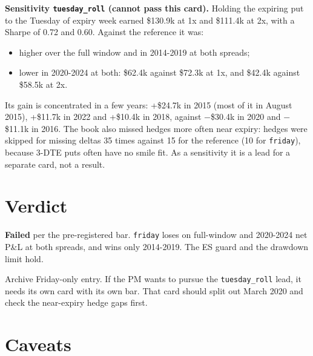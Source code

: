 \documentclass{article}
\begin{document}
\textbf{Sensitivity \texttt{tuesday\_\allowbreak{}roll} (cannot pass this card).} Holding the expiring put to the Tuesday of expiry week earned \$130.9k at 1x and \$111.4k at 2x, with a Sharpe of 0.72 and 0.60. Against the reference it was:

\begin{itemize}

\item higher over the full window and in 2014-2019 at both spreads;

\item lower in 2020-2024 at both: \$62.4k against \$72.3k at 1x, and \$42.4k against \$58.5k at 2x.

\end{itemize}

Its gain is concentrated in a few years: +\$24.7k in 2015 (most of it in August 2015), +\$11.7k in 2022 and +\$10.4k in 2018, against \ensuremath{-}\$30.4k in 2020 and \ensuremath{-}\$11.1k in 2016. The book also missed hedges more often near expiry: hedges were skipped for missing deltas 35 times against 15 for the reference (10 for \texttt{friday}), because 3-DTE puts often have no smile fit. As a sensitivity it is a lead for a separate card, not a result.

\section{Verdict}

\textbf{Failed} per the pre-registered bar. \texttt{friday} loses on full-window and 2020-2024 net P\&L at both spreads, and wins only 2014-2019. The ES guard and the drawdown limit hold.

Archive Friday-only entry. If the PM wants to pursue the \texttt{tuesday\_\allowbreak{}roll} lead, it needs its own card with its own bar. That card should split out March 2020 and check the near-expiry hedge gaps first.

\section{Caveats}
\end{document}
